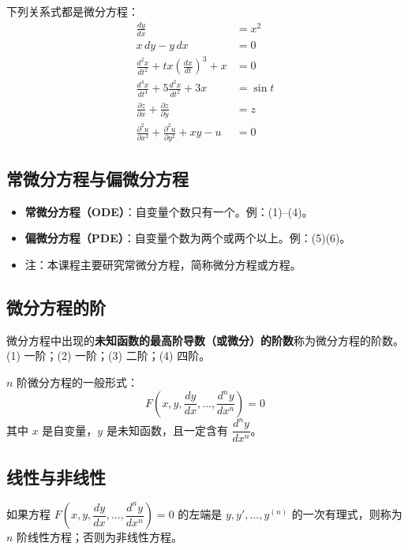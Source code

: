 \begin{example}
下列关系式都是微分方程：
\begin{align}
\frac{dy}{dx} &= x^2 \tag{1} \\
x\,dy - y\,dx &= 0 \tag{2} \\
\frac{d^2x}{dt^2} + tx\left(\frac{dx}{dt}\right)^3 + x &= 0 \tag{3} \\
\frac{d^4x}{dt^4} + 5\frac{d^2x}{dt^2} + 3x &= \sin t \tag{4} \\
\frac{\partial z}{\partial x} + \frac{\partial z}{\partial y} &= z \tag{5} \\
\frac{\partial^2 u}{\partial x^2} + \frac{\partial^2 u}{\partial y^2} + xy - u &= 0 \tag{6}
\end{align}
\end{example}

\subsection{常微分方程与偏微分方程}

\begin{itemize}
    \item \textbf{常微分方程（ODE）}：自变量个数只有一个。例：(1)--(4)。
    \item \textbf{偏微分方程（PDE）}：自变量个数为两个或两个以上。例：(5)(6)。
    \item 注：本课程主要研究常微分方程，简称微分方程或方程。
\end{itemize}

\subsection{微分方程的阶}

微分方程中出现的\textbf{未知函数的最高阶导数（或微分）的阶数}称为微分方程的阶数。(1) 一阶；(2) 一阶；(3) 二阶；(4) 四阶。

$n$ 阶微分方程的一般形式：
$$F\left(x, y, \frac{dy}{dx}, \ldots, \frac{d^n y}{dx^n}\right) = 0$$
其中 $x$ 是自变量，$y$ 是未知函数，且一定含有 $\dfrac{d^n y}{dx^n}$。

\subsection{线性与非线性}

如果方程 $F\left(x, y, \dfrac{dy}{dx}, \ldots, \dfrac{d^n y}{dx^n}\right) = 0$ 的左端是 $y, y', \ldots, y^{(n)}$ 的一次有理式，则称为 $n$ 阶线性方程；否则为非线性方程。


